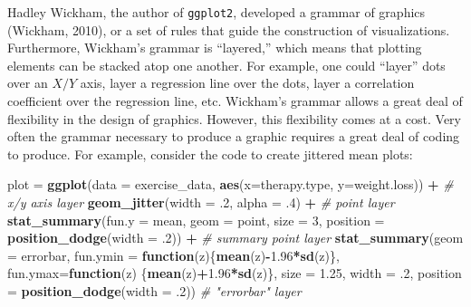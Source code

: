 \documentclass[
  man]{apa6}
\newenvironment{Shaded}{\begin{snugshade}}{\end{snugshade}}
\newcommand{\CommentTok}[1]{\textcolor[rgb]{0.56,0.35,0.01}{\textit{#1}}}
\newcommand{\ControlFlowTok}[1]{\textcolor[rgb]{0.13,0.29,0.53}{\textbf{#1}}}
\newcommand{\DataTypeTok}[1]{\textcolor[rgb]{0.13,0.29,0.53}{#1}}
\newcommand{\DecValTok}[1]{\textcolor[rgb]{0.00,0.00,0.81}{#1}}
\newcommand{\FloatTok}[1]{\textcolor[rgb]{0.00,0.00,0.81}{#1}}
\newcommand{\KeywordTok}[1]{\textcolor[rgb]{0.13,0.29,0.53}{\textbf{#1}}}
\newcommand{\NormalTok}[1]{#1}
\newcommand{\OperatorTok}[1]{\textcolor[rgb]{0.81,0.36,0.00}{\textbf{#1}}}
\newcommand{\StringTok}[1]{\textcolor[rgb]{0.31,0.60,0.02}{#1}}
\begin{document}
Hadley Wickham, the author of \texttt{ggplot2}, developed a grammar of graphics (Wickham, 2010), or a set of rules that guide the construction of visualizations. Furthermore, Wickham's grammar is ``layered,'' which means that plotting elements can be stacked atop one another. For example, one could ``layer'' dots over an \(X/Y\) axis, layer a regression line over the dots, layer a correlation coefficient over the regression line, etc. Wickham's grammar allows a great deal of flexibility in the design of graphics. However, this flexibility comes at a cost. Very often the grammar necessary to produce a graphic requires a great deal of coding to produce. For example, consider the code to create jittered mean plots:

\small

\begin{Shaded}
\begin{Highlighting}[]
\NormalTok{plot =}\StringTok{ }\KeywordTok{ggplot}\NormalTok{(}\DataTypeTok{data =}\NormalTok{ exercise\_data, }\KeywordTok{aes}\NormalTok{(}\DataTypeTok{x=}\NormalTok{therapy.type, }\DataTypeTok{y=}\NormalTok{weight.loss)) }\OperatorTok{+}\StringTok{ }
\StringTok{      }\CommentTok{\# x/y axis layer}
\StringTok{  }\KeywordTok{geom\_jitter}\NormalTok{(}\DataTypeTok{width =} \FloatTok{.2}\NormalTok{, }\DataTypeTok{alpha =} \FloatTok{.4}\NormalTok{) }\OperatorTok{+}\StringTok{ }
\StringTok{      }\CommentTok{\# point layer}
\StringTok{  }\KeywordTok{stat\_summary}\NormalTok{(}\DataTypeTok{fun.y =} \StringTok{\textquotesingle{}mean\textquotesingle{}}\NormalTok{, }\DataTypeTok{geom =} \StringTok{\textquotesingle{}point\textquotesingle{}}\NormalTok{, }
        \DataTypeTok{size =} \DecValTok{3}\NormalTok{, }\DataTypeTok{position =} \KeywordTok{position\_dodge}\NormalTok{(}\DataTypeTok{width =} \FloatTok{.2}\NormalTok{)) }\OperatorTok{+}\StringTok{ }
\StringTok{      }\CommentTok{\# summary point layer}
\StringTok{  }\KeywordTok{stat\_summary}\NormalTok{(}\DataTypeTok{geom =} \StringTok{\textquotesingle{}errorbar\textquotesingle{}}\NormalTok{, }\DataTypeTok{fun.ymin =} \ControlFlowTok{function}\NormalTok{(z)\{}\KeywordTok{mean}\NormalTok{(z)}\OperatorTok{{-}}\FloatTok{1.96}\OperatorTok{*}\KeywordTok{sd}\NormalTok{(z)\}, }
        \DataTypeTok{fun.ymax=}\ControlFlowTok{function}\NormalTok{(z) \{}\KeywordTok{mean}\NormalTok{(z)}\OperatorTok{+}\FloatTok{1.96}\OperatorTok{*}\KeywordTok{sd}\NormalTok{(z)\}, }
        \DataTypeTok{size =} \FloatTok{1.25}\NormalTok{, }\DataTypeTok{width =} \FloatTok{.2}\NormalTok{, }\DataTypeTok{position =} \KeywordTok{position\_dodge}\NormalTok{(}\DataTypeTok{width =} \FloatTok{.2}\NormalTok{))  }
      \CommentTok{\# "errorbar" layer}
\end{Highlighting}
\end{Shaded}
\end{document}
